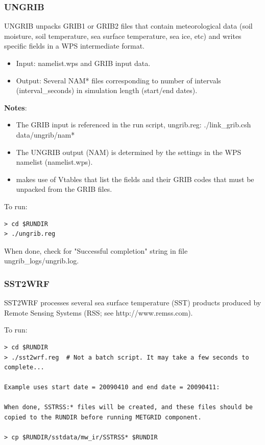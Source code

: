 \begin{frame}[fragile]\frametitle{UNGRIB}

\scriptsize{
UNGRIB unpacks GRIB1 or GRIB2 files that contain  meteorological data (soil moisture, soil temperature, sea surface temperature, sea ice, etc) and writes specific fields in a WPS intermediate format.
\begin{itemize}
\item Input: namelist.wps  and GRIB input data.
\item Output: Several NAM* files corresponding to number of intervals (interval\_seconds) in simulation length (start/end dates).
\end{itemize}}
\scriptsize{\textbf{Notes}: 
\begin{itemize}
\item The GRIB input is referenced in the run script, ungrib.reg:
      ./link\_grib.csh data/ungrib/nam*\\
\item The UNGRIB output (NAM) is determined by the settings in the WPS namelist (namelist.wps).
\item makes use of Vtables that list the fields and their GRIB codes that must be unpacked from the GRIB files.
\end{itemize}
}
\hrulefill\par
\scriptsize{To run:}
\verbatimfont{\scriptsize}%
\begin{verbatim}
> cd $RUNDIR
> ./ungrib.reg
\end{verbatim}
When done, check for "Successful completion" string in file ungrib\_logs/ungrib.log.

\end{frame}

\begin{frame}[fragile]
\frametitle{SST2WRF}

\footnotesize{
SST2WRF processes several sea surface temperature (SST) products produced by Remote Sensing Systems (RSS; see http://www.remss.com).\\
}    
\hrulefill\par
\footnotesize{To run:}
\begin{lstlisting}
> cd $RUNDIR
> ./sst2wrf.reg  # Not a batch script. It may take a few seconds to complete...

Example uses start date = 20090410 and end date = 20090411: 

When done, SSTRSS:* files will be created, and these files should be copied to the RUNDIR before running METGRID component. 

> cp $RUNDIR/sstdata/mw_ir/SSTRSS* $RUNDIR
\end{lstlisting}

\end{frame}


